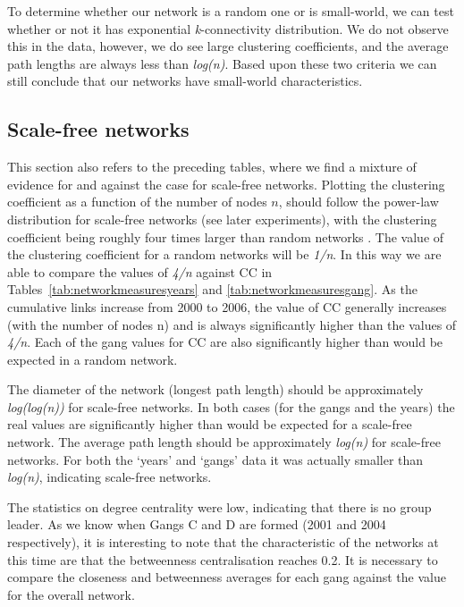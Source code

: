 \documentclass[twocolumn]{svjour3}          %
\theoremstyle{definition}
\begin{document}
To determine whether our network is a random one or is small-world, we
can test whether or not it has exponential \emph{k}-connectivity
distribution. We do not observe this in the data, however, we do see
large clustering coefficients, and the average path lengths are always
less than {\emph{log(n)}}. Based upon these two criteria we can still
conclude that our networks have small-world characteristics.


\subsection{Scale-free networks}\label{sec:scalefree}

This section also refers to the preceding tables, where we find a
mixture of evidence for and against the case for scale-free
networks. Plotting the clustering coefficient as a function of the
number of nodes $n$, should follow the power-law distribution for
scale-free networks (see later experiments), with the clustering
coefficient being roughly four times larger than random
networks \citep{AlbAlbNak04}. The value of the clustering coefficient
for a random networks will be \emph{1/n}. In this way we are able to
compare the values of \emph{4/n} against CC in
Tables~\ref{tab:networkmeasuresyears} and
\ref{tab:networkmeasuresgang}. As the cumulative links increase from
2000 to 2006, the value of CC generally increases (with the number of
nodes n) and is always significantly higher than the values of
\emph{4/n}. Each of the gang values for CC are also significantly
higher than would be expected in a random network.

The diameter of the network (longest path length) should be
approximately \emph{log(log(n))} for scale-free networks. In both
cases (for the gangs and the years) the real values are significantly
higher than would be expected for a scale-free network. The average
path length should be approximately \emph{log(n)} for scale-free
networks. For both the `years' and `gangs' data it was actually
smaller than \emph{log(n)}, indicating scale-free networks.

The statistics on degree centrality were low, indicating that there is
no group leader. As we know when Gangs C and D are formed (2001
and 2004 respectively), it is interesting to note that the
characteristic of the networks at this time are that the betweenness
centralisation reaches 0.2. It is necessary to compare the closeness and
betweenness averages for each gang against the value for the overall
network.
\end{document}
